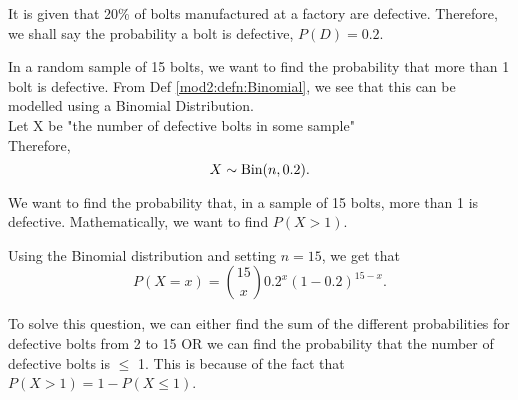 %
%
%

\begin{subquestions}
	
	
\subquestion

It is given that 20\% of bolts manufactured at a factory are defective. Therefore, we shall say the probability a bolt is defective, $P(D)= 0.2$. 

\begin{subsubquestions}
	
	
\subsubquestion	

In a random sample of 15 bolts, we want to find the probability that more than 1 bolt is defective. From Def \ref{mod2:defn:Binomial}, we see that this can be modelled using a Binomial Distribution.\\

Let X be "the number of defective bolts in some sample" \\
Therefore, 
\begin{equation}
	 X \sim \text{Bin}(n,0.2). 	\\ \nonumber
\end{equation}



We want to find the probability that, in a sample of 15 bolts, more than 1 is defective. Mathematically, we want to find $P(X>1)$.

Using the Binomial distribution and setting $n=15$, we get that
\begin{equation}
	P(X = x) = { 15 \choose x} 0.2^x (1-0.2)^{15-x} . 
\end{equation}

To solve this question, we can either find the sum of the different probabilities for defective bolts from 2 to 15 OR we can find the probability that the number of defective bolts is $\leq$ 1. This is because of the fact that $P(X>1)=1-P(X\leq1)$.  \\


\end{subsubquestions}
\end{subquestions}

